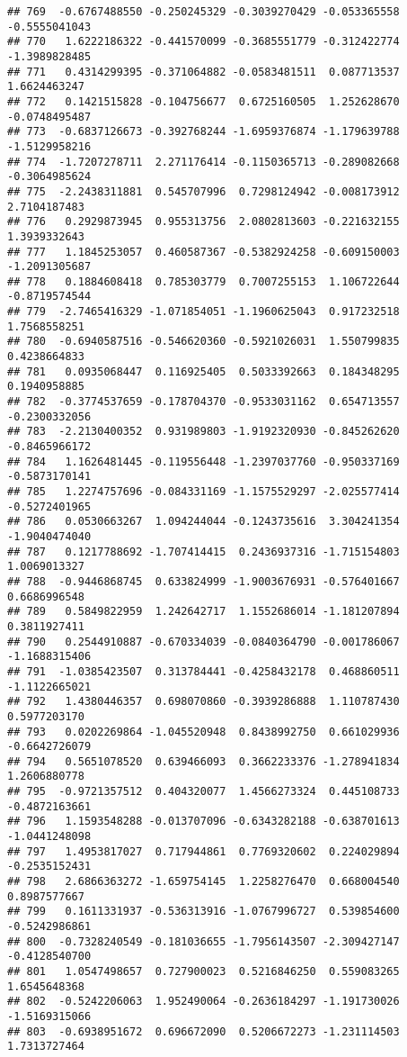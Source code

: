 \documentclass[
]{article}
\begin{document}
\begin{verbatim}
## 769  -0.6767488550 -0.250245329 -0.3039270429 -0.053365558 -0.5555041043
## 770   1.6222186322 -0.441570099 -0.3685551779 -0.312422774 -1.3989828485
## 771   0.4314299395 -0.371064882 -0.0583481511  0.087713537  1.6624463247
## 772   0.1421515828 -0.104756677  0.6725160505  1.252628670 -0.0748495487
## 773  -0.6837126673 -0.392768244 -1.6959376874 -1.179639788 -1.5129958216
## 774  -1.7207278711  2.271176414 -0.1150365713 -0.289082668 -0.3064985624
## 775  -2.2438311881  0.545707996  0.7298124942 -0.008173912  2.7104187483
## 776   0.2929873945  0.955313756  2.0802813603 -0.221632155  1.3939332643
## 777   1.1845253057  0.460587367 -0.5382924258 -0.609150003 -1.2091305687
## 778   0.1884608418  0.785303779  0.7007255153  1.106722644 -0.8719574544
## 779  -2.7465416329 -1.071854051 -1.1960625043  0.917232518  1.7568558251
## 780  -0.6940587516 -0.546620360 -0.5921026031  1.550799835  0.4238664833
## 781   0.0935068447  0.116925405  0.5033392663  0.184348295  0.1940958885
## 782  -0.3774537659 -0.178704370 -0.9533031162  0.654713557 -0.2300332056
## 783  -2.2130400352  0.931989803 -1.9192320930 -0.845262620 -0.8465966172
## 784   1.1626481445 -0.119556448 -1.2397037760 -0.950337169 -0.5873170141
## 785   1.2274757696 -0.084331169 -1.1575529297 -2.025577414 -0.5272401965
## 786   0.0530663267  1.094244044 -0.1243735616  3.304241354 -1.9040474040
## 787   0.1217788692 -1.707414415  0.2436937316 -1.715154803  1.0069013327
## 788  -0.9446868745  0.633824999 -1.9003676931 -0.576401667  0.6686996548
## 789   0.5849822959  1.242642717  1.1552686014 -1.181207894  0.3811927411
## 790   0.2544910887 -0.670334039 -0.0840364790 -0.001786067 -1.1688315406
## 791  -1.0385423507  0.313784441 -0.4258432178  0.468860511 -1.1122665021
## 792   1.4380446357  0.698070860 -0.3939286888  1.110787430  0.5977203170
## 793   0.0202269864 -1.045520948  0.8438992750  0.661029936 -0.6642726079
## 794   0.5651078520  0.639466093  0.3662233376 -1.278941834  1.2606880778
## 795  -0.9721357512  0.404320077  1.4566273324  0.445108733 -0.4872163661
## 796   1.1593548288 -0.013707096 -0.6343282188 -0.638701613 -1.0441248098
## 797   1.4953817027  0.717944861  0.7769320602  0.224029894 -0.2535152431
## 798   2.6866363272 -1.659754145  1.2258276470  0.668004540  0.8987577667
## 799   0.1611331937 -0.536313916 -1.0767996727  0.539854600 -0.5242986861
## 800  -0.7328240549 -0.181036655 -1.7956143507 -2.309427147 -0.4128540700
## 801   1.0547498657  0.727900023  0.5216846250  0.559083265  1.6545648368
## 802  -0.5242206063  1.952490064 -0.2636184297 -1.191730026 -1.5169315066
## 803  -0.6938951672  0.696672090  0.5206672273 -1.231114503  1.7313727464

\end{verbatim}
\end{document}
